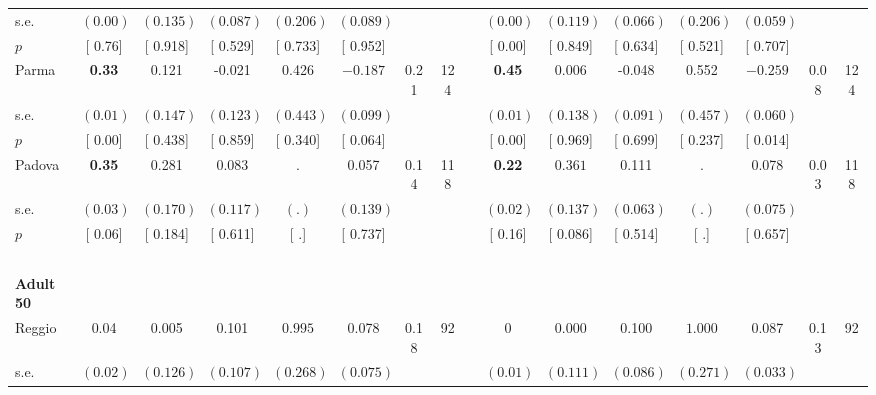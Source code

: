 \begin{longtable}{L{8em} c c c c c c c p{1em} c c c c c c c}
\quad \quad \quad \quad s.e.& $ (     0.00)$ & $ (    0.135)$ & $ (    0.087)$ & $ (    0.206)$ & $ (    0.089)$ & & & & $ (     0.00)$ & $ (    0.119)$ & $ (    0.066)$ & $ (    0.206)$ & $ (    0.059)$ & &  \\*
\quad \quad \quad \quad $ p$ & [     0.76] & [    0.918] & [    0.529] & [    0.733] & [    0.952] & & & & [     0.00] & [    0.849] & [    0.634] & [    0.521] & [    0.707] & &  \\[1em]
\quad \quad \quad Parma& \textbf{     0.33} &     0.121 &    -0.021 &     0.426 & $ \mathbf{   -0.187}$ &      0.21 &       124 & & \textbf{     0.45} &     0.006 &    -0.048 &     0.552 & $ \mathbf{   -0.259}$ &      0.08 &       124  \\*
\quad \quad \quad \quad s.e.& $ (     0.01)$ & $ (    0.147)$ & $ (    0.123)$ & $ (    0.443)$ & $ (    0.099)$ & & & & $ (     0.01)$ & $ (    0.138)$ & $ (    0.091)$ & $ (    0.457)$ & $ (    0.060)$ & &  \\*
\quad \quad \quad \quad $ p$ & [     0.00] & [    0.438] & [    0.859] & [    0.340] & [    0.064] & & & & [     0.00] & [    0.969] & [    0.699] & [    0.237] & [    0.014] & &  \\[1em]
\quad \quad \quad Padova& \textbf{     0.35} &     0.281 &     0.083 &         . &     0.057 &      0.14 &       118 & & \textbf{     0.22} & $ \mathbf{    0.361}$ &     0.111 &         . &     0.078 &      0.03 &       118  \\*
\quad \quad \quad \quad s.e.& $ (     0.03)$ & $ (    0.170)$ & $ (    0.117)$ & $ (        .)$ & $ (    0.139)$ & & & & $ (     0.02)$ & $ (    0.137)$ & $ (    0.063)$ & $ (        .)$ & $ (    0.075)$ & &  \\*
\quad \quad \quad \quad $ p$ & [     0.06] & [    0.184] & [    0.611] & [        .] & [    0.737] & & & & [     0.16] & [    0.086] & [    0.514] & [        .] & [    0.657] & &  \\[1em]
~\\[1em]
\quad \quad \textbf{Adult 50} & & & & & & & & & & & & & & & \\* 
\quad \quad \quad Reggio& 0.04 &     0.005 &     0.101 & $ \mathbf{    0.995}$ &     0.078 &      0.18 &        92 & & 0 &     0.000 &     0.100 & $ \mathbf{    1.000}$ &     0.087 &      0.13 &        92  \\*
\quad \quad \quad \quad s.e.& $ (     0.02)$ & $ (    0.126)$ & $ (    0.107)$ & $ (    0.268)$ & $ (    0.075)$ & & & & $ (     0.01)$ & $ (    0.111)$ & $ (    0.086)$ & $ (    0.271)$ & $ (    0.033)$ & &  \\*

\end{longtable}
